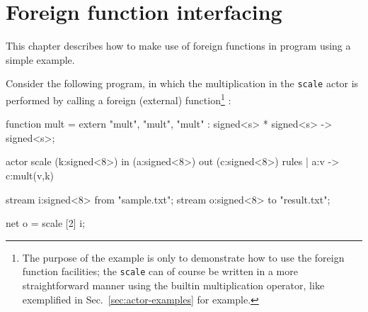 
\chapter{Foreign function interfacing}
\label{cha:foreign-funct-interf}

This chapter describes how to make use of foreign functions in \caph program using a simple example.

Consider the following program, in which the multiplication in the \texttt{scale} actor is performed
by calling a foreign (external) function\footnote{The purpose of the example is only to
  demonstrate how to use the foreign function facilities; the \texttt{scale} can of course be
  written in a more straightforward manner using the builtin multiplication operator, like
  exemplified in Sec.~\ref{sec:actor-examples} for example.} : 

\begin{example}
function mult = extern "mult", "mult", "mult" :
  signed<s> * signed<s> -> signed<s>;

actor scale (k:signed<8>)
  in (a:signed<8>)
  out (c:signed<8>)
rules
| a:v -> c:mult(v,k)

stream i:signed<8> from "sample.txt";
stream o:signed<8> to "result.txt";

net o = scale [2] i;
\end{example}

